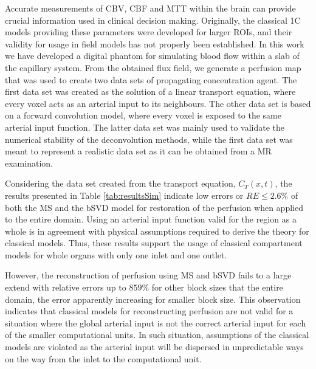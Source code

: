 \documentclass[paper=a4, fontsize=11pt,parskip=half,headings=small]{scrartcl}
\begin{document}
	Accurate measurements of CBV, CBF and MTT within the brain can provide crucial information used in clinical decision making. Originally, the classical 1C models providing these parameters were developed for larger ROIs, and their validity for usage in field models has not properly been established. In this work we have developed a digital phantom for simulating blood flow within a slab of the capillary system. From the obtained flux field, we generate a perfusion map that was used to create two data sets of propagating concentration agent. The first data set was created as the solution of a linear transport equation, where every voxel acts as an arterial input to its neighbours. The other data set is based on a forward convolution model, where every voxel is exposed to the same arterial input function. The latter data set was mainly used to validate the numerical stability of the deconvolution methods, while the first data set was meant to represent a realistic data set as it can be obtained from a MR examination.
	
	Considering the data set created from the transport equation, $C_T(x,t)$, the results presented in Table \ref{tab:resultsSim} indicate low errors or $RE \leq 2.6 \%$ of both the MS and the bSVD model for restoration of the perfusion when applied to the entire domain. Using an arterial input function valid for the region as a whole is in agreement with physical assumptions required to derive the theory for classical models. Thus, these results support the usage of classical compartment models for whole organs with only one inlet and one outlet. 

However, the reconstruction of perfusion using MS and bSVD fails to a large extend with relative errors up to $859 \%$ for other block sizes that the entire domain, the error  apparently increasing for smaller block size. This observation indicates that classical models for reconstructing perfusion are not valid for a situation where the global arterial input is not the correct arterial input for each of the smaller computational units. In such situation, assumptions of the classical models are violated as the arterial input will be dispersed in unpredictable ways on the way from the inlet to the computational unit.
\end{document}
